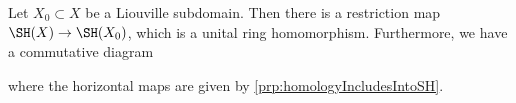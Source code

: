 

    \label{thm:viterboRestriction}
    Let $X_0\subset X$ be a Liouville subdomain. Then there is a restriction map $\SH(X)\to \SH(X_0)$, which is a unital ring homomorphism. Furthermore, we have a commutative diagram
    
    where the horizontal maps are given by \cref{prp:homologyIncludesIntoSH}.
